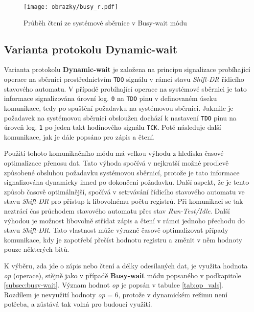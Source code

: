 \begin{figure}[H]
  \begin{center}
    \texttt{[image: obrazky/busy\_r.pdf]}
  \end{center}
  \caption{Průběh čtení ze systémové sběrnice v Busy-wait módu}
	\label{fig:busy_r}
\end{figure}

\subsection{Varianta protokolu Dynamic-wait}	\label{subsec:dyn-wait}
Varianta protokolu \textbf{Dynamic-wait} je založena na principu signalizace probíhající operace na sběrnici prostřednictvím \texttt{\acs{TDO}} signálu v rámci stavu \textit{Shift-DR} řídicího stavového automatu. V případě probíhající operace na systémové sběrnici je tato informace signalizována úrovní log. \texttt{0} na \texttt{\acs{TDO}} pinu v definovaném úseku komunikace, tedy po spuštění požadavku na systémovou sběrnici. Jakmile je požadavek na systémovou sběrnici obsloužen dochází k nastavení \texttt{\acs{TDO}} pinu na úroveň log. \texttt{1} po jeden takt hodinového signálu \texttt{\acs{TCK}}. Poté následuje další komunikace, jak je dále popsáno pro zápis a čtení.

Použití tohoto komunikačního módu má velkou výhodu z hlediska časové optimalizace přenosu dat. Tato výhoda spočívá v nejkratší možné prodlevě způsobené obsluhou požadavku systémovou sběrnicí, protože je tato informace signalizována dynamicky ihned po dokončení požadavku. Další aspekt, že je tento způsob časově optimálnější, spočívá v setrvávání řídicího stavového automatu ve stavu \textit{Shift-DR} pro přístup k libovolnému počtu registrů. Při komunikaci se tak neztrácí čas průchodem stavového automatu přes stav \textit{Run-Test/Idle}. Další výhodou je možnost libovolně střídat zápis a čtení v rámci jednoho přechodu do stavu \textit{Shift-DR}. Tato vlastnost může výrazně časově optimalizovat případy komunikace, kdy je zapotřebí přečíst hodnotu registru a změnit v něm hodnoty pouze některých bitů.

K výběru, zda jde o zápis nebo čtení a délky odesílaných dat, je využita hodnota \textit{op} (operace), stějně jako v případě \textbf{Busy-wait} módu popsaného v podkapitole \ref{subsec:busy-wait}. Význam hodnot \textit{op} je popsán v tabulce \ref{tab:op_vals}. Rozdílem je nevyužití hodnoty \textit{op} = 6, protože v dynamickém režimu není potřeba, a zůstává tak volná pro budoucí využití.

